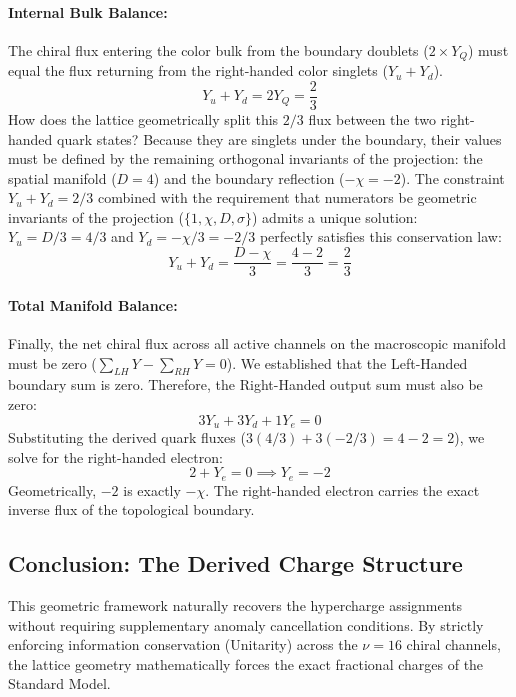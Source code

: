 \paragraph{Internal Bulk Balance:}
The chiral flux entering the color bulk from the boundary doublets ($2 \times Y_Q$) must equal the flux returning from the right-handed color singlets ($Y_u + Y_d$).
\begin{equation}
Y_u + Y_d = 2 Y_Q = \frac{2}{3}
\end{equation}
How does the lattice geometrically split this $2/3$ flux between the two right-handed quark states? Because they are singlets under the boundary, their values must be defined by the remaining orthogonal invariants of the projection: the spatial manifold ($D=4$) and the boundary reflection ($-\chi = -2$). The constraint $Y_u + Y_d = 2/3$ combined with the requirement that numerators be geometric invariants of the projection ($\{1, \chi, D, \sigma\}$) admits a unique solution: $Y_u = D/3 = 4/3$ and $Y_d = -\chi/3 = -2/3$ perfectly satisfies this conservation law:
\begin{equation}
Y_u + Y_d = \frac{D - \chi}{3} = \frac{4 - 2}{3} = \frac{2}{3}
\end{equation}

\paragraph{Total Manifold Balance:}
Finally, the net chiral flux across all active channels on the macroscopic manifold must be zero ($\sum_{LH} Y - \sum_{RH} Y = 0$). We established that the Left-Handed boundary sum is zero. Therefore, the Right-Handed output sum must also be zero:
\begin{equation}
3 Y_u + 3 Y_d + 1 Y_e = 0
\end{equation}
Substituting the derived quark fluxes ($3(4/3) + 3(-2/3) = 4 - 2 = 2$), we solve for the right-handed electron:
\begin{equation}
2 + Y_e = 0 \implies Y_e = -2
\end{equation}
Geometrically, $-2$ is exactly $-\chi$. The right-handed electron carries the exact inverse flux of the topological boundary.

\subsection{Conclusion: The Derived Charge Structure}
This geometric framework naturally recovers the hypercharge assignments without requiring supplementary anomaly cancellation conditions. By strictly enforcing information conservation (Unitarity) across the $\nu=16$ chiral channels, the lattice geometry mathematically forces the exact fractional charges of the Standard Model. 

